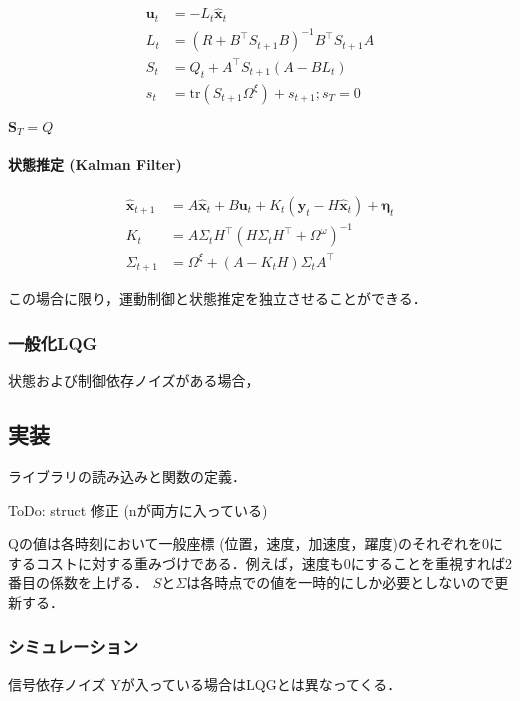 \begin{align}
\mathbf{u}_{t}&=-L_{t} \widehat{\mathbf{x}}_{t}\\
L_{t}&=\left(R+B^{\top} S_{t+1} B\right)^{-1} B^{\top} S_{t+1} A\\
S_{t}&=Q_{t}+A^{\top} S_{t+1}\left(A-B L_{t}\right)\\
s_t &= \mathrm{tr}(S_{t+1}\Omega^\xi) + s_{t+1}; s_T=0
\end{align}


$\boldsymbol{S}_{T}=Q$

\paragraph{状態推定 (Kalman Filter)}


\begin{align}
\widehat{\mathbf{x}}_{t+1}&=A \widehat{\mathbf{x}}_{t}+B \mathbf{u}_{t}+K_{t}\left(\mathbf{y}_{t}-H \widehat{\mathbf{x}}_{t}\right)+\boldsymbol{\eta}_{t} \\ 
K_{t}&=A \Sigma_{t} H^{\top}\left(H \Sigma_{t} H^{\top}+\Omega^{\omega}\right)^{-1} \\ 
\Sigma_{t+1}&=\Omega^{\xi}+\left(A-K_{t} H\right) \Sigma_{t} A^{\top}
\end{align}


この場合に限り，運動制御と状態推定を独立させることができる．
\subsubsection{一般化LQG}
状態および制御依存ノイズがある場合，
\subsection{実装}
ライブラリの読み込みと関数の定義．

ToDo: struct 修正 (nが両方に入っている) 

Qの値は各時刻において一般座標 (位置，速度，加速度，躍度)のそれぞれを0にするコストに対する重みづけである．例えば，速度も0にすることを重視すれば2番目の係数を上げる．
$S$と$\Sigma$は各時点での値を一時的にしか必要としないので更新する．

\subsubsection{シミュレーション}
信号依存ノイズ Yが入っている場合はLQGとは異なってくる．


